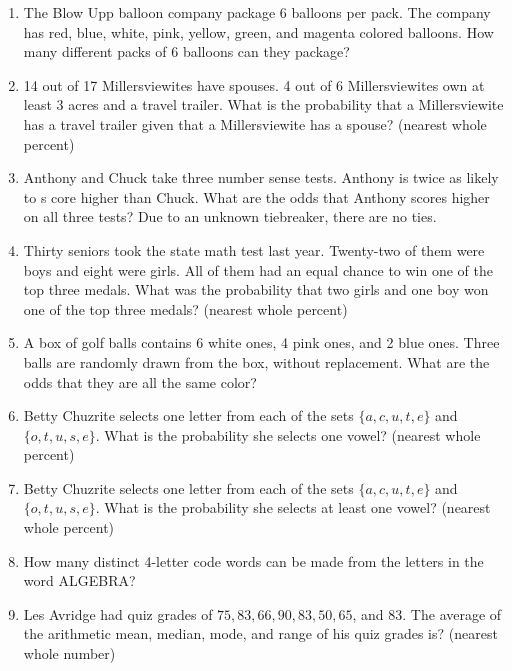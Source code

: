 \documentclass[../uilmath.tex]{subfiles}
\begin{document}
\begin{enumerate}[label=\bfseries\arabic*.]
    \item %
    The Blow Upp balloon company package 6 balloons per pack. The company has red, blue, white, pink, yellow,
    green, and magenta colored balloons. How many different packs of 6 balloons can they package?

    \item %
    14 out of 17 Millersviewites have spouses. 4 out of 6 Millersviewites own at least 3 acres and a travel trailer. What is the probability
    that a Millersviewite has a travel trailer given that a Millersviewite has a spouse? (nearest whole percent)

    \item %
    Anthony and Chuck take three number sense tests. Anthony is twice as likely to s core higher than Chuck. What are the odds that Anthony scores higher on all three tests? Due to an unknown tiebreaker, there are no ties.

    \item %
    Thirty seniors took the state math test last year. Twenty-two of them were boys and eight were girls. All of them had an equal chance to win one 
    of the top three medals. What was the probability that two girls and one boy won one of the top three medals? (nearest whole percent)

    \item %
    A box of golf balls contains 6 white ones, 4 pink ones, and 2 blue ones. Three balls are randomly drawn from the box, without replacement.
    What are the odds that they are all the same color?

    \item %
    Betty Chuzrite selects one letter from each of the sets $\{a,c,u,t,e\}$ and $\{o,t,u,s,e\}$. What is the probability she selects one vowel? (nearest whole percent)

    \item %
    Betty Chuzrite selects one letter from each of the sets $\{a,c,u,t,e\}$ and $\{o,t,u,s,e\}$. What is the probability she selects at least one vowel? (nearest whole percent) 

    \item %
    How many distinct 4-letter code words can be made from the letters in the word ALGEBRA?

    \item %
    Les Avridge had quiz grades of $75,83,66,90,83,50,65$, and $83$. The average of the arithmetic mean, median, 
    mode, and range of his quiz grades is? (nearest whole number)


\end{enumerate}
\end{document}
